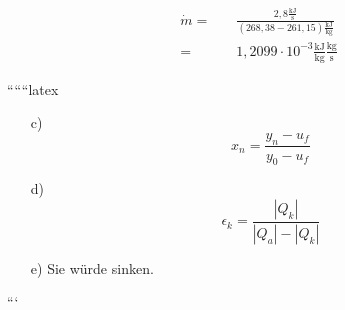 \begin{align*}
    \dot{m} = \quad & \frac{2,8 \frac{\text{kJ}}{\text{s}}}{(268,38 - 261,15) \frac{\text{kJ}}{\text{kg}}} \\
    = \quad & 1,2099 \cdot 10^{-3} \frac{\text{kJ}}{\text{kg}} \frac{\text{kg}}{\text{s}}
\end{align*}

``````latex


\begin{itemize}
    \item[c)] 
    \[
    x_{n} = \frac{y_{n} - u_{f}}{y_{0} - u_{f}}
    \]
    
    \item[d)] 
    \[
    \epsilon_{k} = \frac{|Q_{k}|}{|Q_{a}| - |Q_{k}|}
    \]
    
    \item[e)] 
    Sie würde sinken.
    
\end{itemize}

```